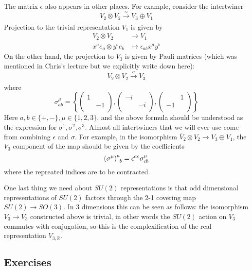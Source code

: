The matrix $\epsilon $ also appears in other places. For example, consider 
the intertwiner 
\[ 
    V_2 \otimes V_2 \xrightarrow[]{\simeq } V_3 \oplus V_1
\]
Projection to the trivial representation $V_1$ is given by 
\begin{align*}
    V_2 \otimes V_2 &\to V_1 \\
    x^a e_a \otimes y^b e_b & \mapsto \epsilon _{ab}x^ay^b
\end{align*}
On the other hand, the projection to $V_3$ is given by Pauli matrices (which was 
mentioned in Chris's lecture but we explicitly write down here): 
\[ 
    V_2 \otimes V_2 \xrightarrow[]{\sigma } V_3
\]
where 
\[ 
    \sigma _{ab}^\mu  = \left\{
        \begin{pmatrix}
        1 & \\
         & -1\\
        \end{pmatrix},
        \begin{pmatrix}
        -i &  \\
         & -i \\
        \end{pmatrix},
        \begin{pmatrix}
        &1 \\
        -1 & \\
        \end{pmatrix}
    \right\}
\]
Here $a,b \in \{+,-\}, \mu \in \{1,2,3\}$, and the above formula should be understood
as the expression for $\sigma ^1, \sigma ^2, \sigma ^3$.
Almost all intertwiners that we will ever use come from combining $\epsilon $ and $\sigma $.
For example, in the isomorphism $\overline{V}_2 \otimes V_2 \to V_3 \oplus V_1$,
the $V_3$ component of the map should be given by the coefficients
\[ 
    \left(\sigma ^{\mu }\right)^a _{\hphantom{1} b} = \epsilon ^{ac} \sigma _{cb}^\mu 
\]
where the repreated indices are to be contracted.

One last thing we need about $SU(2)$ representations is that odd dimensional representations
of $SU(2)$ factors through the 2-1 covering map $SU(2) \to SO(3)$. In 3 dimensions 
this can be seen as follows: the isomorphism $V_3 \to \overline{V}_3$ constructed 
above is trivial, in other words the $SU(2)$ action on $V_3$ commutes with conjugation,
so this is the complexification of the real representation $V _{3, \mathbb{R}}$.

\subsection{Exercises}

